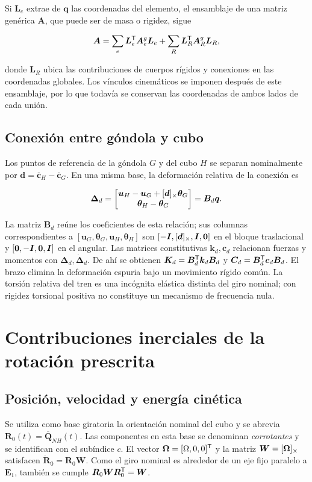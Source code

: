 Si $\bm L_e$ extrae de $\bm q$ las coordenadas del elemento, el ensamblaje de una matriz genérica $\bm A$, que puede ser de masa o rigidez, sigue

\begin{equation}
\bm A=\sum_e\bm L_e^\mathsf T\bm A_e^g\bm L_e
+\sum_R\bm L_R^\mathsf T\bm A_R^g\bm L_R,
\end{equation}

donde $\bm L_R$ ubica las contribuciones de cuerpos rígidos y conexiones en las coordenadas globales. Los vínculos cinemáticos se imponen después de este ensamblaje, por lo que todavía se conservan las coordenadas de ambos lados de cada unión.

\subsection{Conexión entre góndola y cubo}
Los puntos de referencia de la góndola $G$ y del cubo $H$ se separan nominalmente por $\bm d=\overline{\bm c}_H-\overline{\bm c}_G$. En una misma base, la deformación relativa de la conexión es

\begin{equation}
\bm\Delta_d=\begin{bmatrix}
\bm u_H-\bm u_G+[\bm{d}]_\times\bm\theta_G\\
\bm\theta_H-\bm\theta_G
\end{bmatrix}=\bm B_d\bm q.
\end{equation}

La matriz $\bm B_d$ reúne los coeficientes de esta relación; sus columnas correspondientes a $[\bm u_G,\bm\theta_G,\bm u_H,\bm\theta_H]$ son $[-\bm I,[\bm{d}]_\times,\bm I,\bm0]$ en el bloque traslacional y $[\bm0,-\bm I,\bm0,\bm I]$ en el angular. Las matrices constitutivas $\bm k_d,\bm c_d$ relacionan fuerzas y momentos con $\bm\Delta_d,\dot{\bm\Delta}_d$. De ahí se obtienen $\bm K_d=\bm B_d^\mathsf T\bm k_d\bm B_d$ y $\bm C_d=\bm B_d^\mathsf T\bm c_d\bm B_d$. El brazo elimina la deformación espuria bajo un movimiento rígido común. La torsión relativa del tren es una incógnita elástica distinta del giro nominal; con rigidez torsional positiva no constituye un mecanismo de frecuencia nula.

\FloatBarrier
\section{Contribuciones inerciales de la rotación prescrita}
\label{sec:giro}
\subsection{Posición, velocidad y energía cinética}
Se utiliza como base giratoria la orientación nominal del cubo y se abrevia $\bm R_0(t)=\overline{\bm Q}_{NH}(t)$. Las componentes en esta base se denominan \emph{corrotantes} y se identifican con el subíndice $c$. El vector $\bm\Omega=[\Omega,0,0]^\mathsf T$ y la matriz $\bm W=[\bm{\Omega}]_\times$ satisfacen $\dot{\bm R}_0=\bm R_0\bm W$. Como el giro nominal es alrededor de un eje fijo paralelo a $\bm E_1$, también se cumple $\bm R_0\bm W\bm R_0^\mathsf T=\bm W$.

